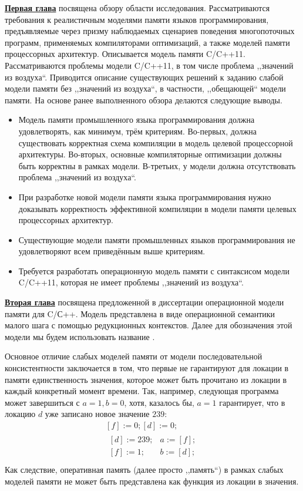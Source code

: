 \underline{\textbf{Первая глава}} посвящена обзору области исследования.
Рассматриваются требования к реалистичным моделями памяти
языков программирования, предъявляемые через призму наблюдаемых сценариев поведения многопоточных программ,
применяемых компиляторами оптимизаций, а также моделей памяти процессорных архитектур.
Описывается модель памяти C/C++11. Рассматриваются проблемы модели C/C++11, в том числе
проблема ,,значений из воздуха``. Приводится описание существующих решений к заданию
слабой модели памяти без ,,значений из воздуха``, в частности, ,,обещающей`` модели памяти.
На основе ранее выполненного обзора делаются следующие выводы.
\begin{itemize}
  \item Модель памяти промышленного языка программирования должна удовлетворять, как минимум, трём критериям.
    Во-первых, должна существовать корректная схема компиляции в модель целевой процессорной
    архитектуры.
    Во-вторых, основные компиляторные оптимизации должны быть корректны в рамках модели.
    В-третьих, у модели должна отсутствовать проблема ,,значений из воздуха``.
  \item При разработке новой модели памяти языка программирования нужно доказывать корректность эффективной компиляции
     в модели памяти целевых процессорных архитектур.
  \item Существующие модели памяти промышленных языков программирования не удовлетворяют всем приведённым выше
    критериям.
  \item Требуется разработать операционную модель памяти с синтаксисом модели C/C++11, которая
    не имеет проблемы ,,значений из воздуха``.
\end{itemize}

\underline{\textbf{Вторая глава}} посвящена предложенной в диссертации операционной  модели памяти для C/С++. Модель представлена в виде операционной семантики малого шага с помощью редукционных
контекстов. Далее для обозначения этой модели мы будем использовать название \OpCpp.

Основное отличие слабых моделей памяти от модели последовательной консистентности заключается в том, что
первые не гарантируют для локации в памяти единственность значения, которое может быть прочитано из локации
в каждый конкретный момент времени.
Так, например, следующая программа может завершиться с $a = 1, b = 0$, хотя, казалось бы, $a = 1$ гарантирует, что
в локацию $d$ уже записано новое значение $239$:
\[
\begin{array}{c}
[f] := 0; [d] := 0; \\
\begin{array}{l||l}
  {} [d] := 239; & a := [f]; \\
  {} [f] := 1;   & b := [d]; \\
\end{array}
\end{array}
\]
Как следствие, оперативная память (далее просто ,,память``) в рамках слабых моделей памяти не может быть представлена как функция из локации в значения.

